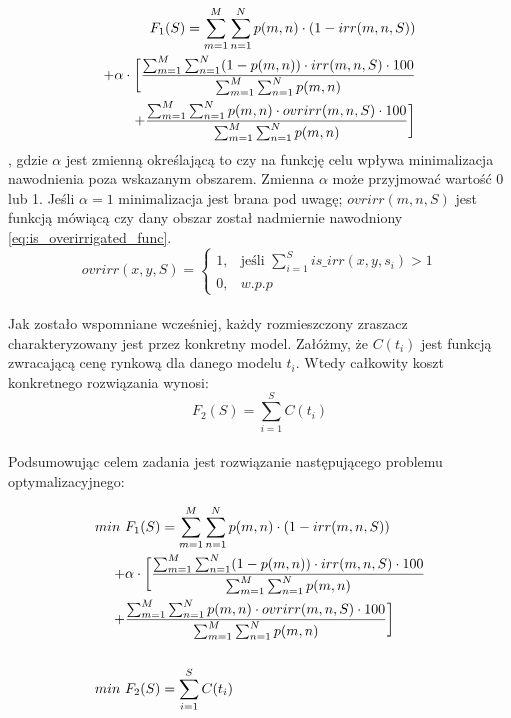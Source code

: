 \documentclass[twoside]{iisthesis}
\begin{document}
\begin{equation}
\begin{split}
	F_{1}(S) = \sum_{m=1}^{M}\sum_{n=1}^{N} p(m,n) \cdot (1 - irr(m,n,S)) \\ + 
	\alpha \cdot \bigg{[}\dfrac{\sum_{m=1}^{M}\sum_{n=1}^{N} (1 - p(m,n)) \cdot irr(m,n,S) \cdot 100}{\sum_{m=1}^{M}\sum_{n=1}^{N} p(m,n)} \\ + \dfrac{\sum_{m=1}^{M}\sum_{n=1}^{N} p(m,n) \cdot ovrirr(m,n,S) \cdot 100}{\sum_{m=1}^{M}\sum_{n=1}^{N} p(m,n)}\bigg{]}
\end{split}
\end{equation}
, gdzie $\alpha$ jest zmienną określającą to czy na funkcję celu wpływa minimalizacja nawodnienia poza wskazanym obszarem. Zmienna $\alpha$ może przyjmować wartość 0 lub 1. Jeśli $\alpha=1$ minimalizacja jest brana pod uwagę; $ovrirr(m,n,S)$ jest funkcją mówiącą czy dany obszar został nadmiernie nawodniony \eqref{eq:is_overirrigated_func}.
\begin{equation}\label{eq:is_overirrigated_func}
	ovrirr(x,y,S) = \begin{cases}
				1,& \text{jeśli } \sum_{i=1}^{S} is\_irr(x,y,s_{i}) > 1 \\
				0,& w.p.p
			   \end{cases}
\end{equation}
\\Jak zostało wspomniane wcześniej, każdy rozmieszczony zraszacz charakteryzowany jest przez konkretny model. Załóżmy, że $C(t_{i})$ jest funkcją zwracającą cenę rynkową dla danego modelu $t_i$. Wtedy całkowity koszt konkretnego rozwiązania wynosi:
\begin{equation}
	F_{2}(S) = \sum_{i=1}^{S} C(t_{i})
\end{equation}\\
Podsumowując celem zadania jest rozwiązanie następującego problemu optymalizacyjnego:

\begin{equation}
	\begin{split}
		min \text{  } & 	F_{1}(S) = \sum_{m=1}^{M}\sum_{n=1}^{N} p(m,n) \cdot (1 - irr(m,n,S)) \\ +& 
		\alpha \cdot \bigg{[}\dfrac{\sum_{m=1}^{M}\sum_{n=1}^{N} (1 - p(m,n)) \cdot irr(m,n,S) \cdot 100}{\sum_{m=1}^{M}\sum_{n=1}^{N} p(m,n)} \\ +& \dfrac{\sum_{m=1}^{M}\sum_{n=1}^{N} p(m,n) \cdot ovrirr(m,n,S) \cdot 100}{\sum_{m=1}^{M}\sum_{n=1}^{N} p(m,n)}\bigg{]}\\\\
		min \text{  }&	F_{2}(S) = \sum_{i=1}^{S} C(t_{i})
	\end{split}
\end{equation}
\end{document}
